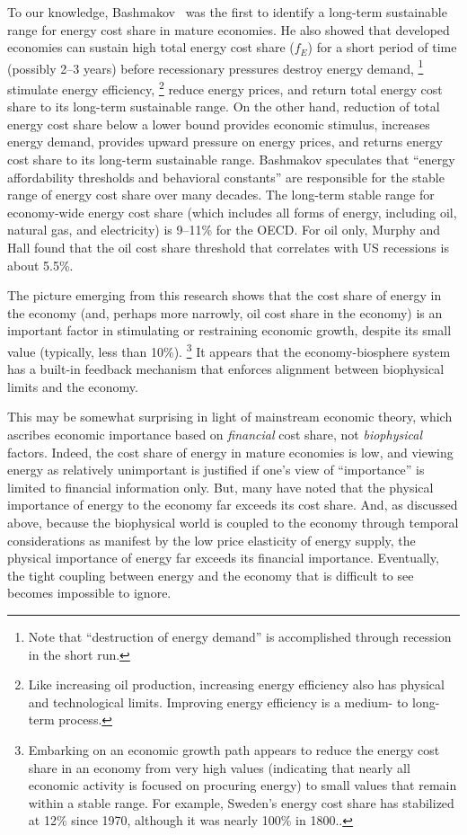 To our knowledge, 
Bashmakov~\cite{Bashmakov:2007ek} was the first to 
identify a long-term sustainable range for energy cost share
in mature economies.
He also showed that developed economies 
can sustain high total energy cost share ($f_E$) 
for a short period of time 
(possibly 2--3 years) 
before recessionary pressures 
destroy energy demand,%
	\footnote{
	Note that ``destruction of energy demand'' 
	is accomplished through recession
	in the short run.
	}
stimulate energy efficiency,%
	\footnote{
	Like increasing oil production, 
	increasing energy efficiency also has 
	physical and technological limits.
	Improving energy efficiency is a medium- to long-term process. 
	}
reduce energy prices, 
and return total energy cost share to its long-term sustainable range.
On the other hand, reduction of total energy cost share below 
a lower bound provides economic stimulus, 
increases energy demand, 
provides upward pressure on energy prices, 
and returns energy cost share to its long-term sustainable range.
Bashmakov speculates that 
``energy affordability thresholds and behavioral constants'' 
are responsible for the stable range of energy cost share 
over many decades.\cite[p.~3585]{Bashmakov:2007ek} 
The long-term stable range for economy-wide energy cost share 
(which includes all forms of energy, including oil, natural gas, and electricity)
is 9--11\% for the OECD. 
For oil only, Murphy and Hall found that 
the oil cost share threshold that correlates with US recessions 
is about 5.5\%.\cite{Murphy:2011jh}

The picture emerging from this research shows that 
the cost share of energy in the economy
(and, perhaps more narrowly, oil cost share in the economy)
is an important factor in stimulating or restraining economic growth,
despite its small value (typically, less than 10\%).%
	\footnote{
	Embarking on an economic growth path
	appears to reduce the energy cost share in an economy from very high values
	(indicating that nearly all economic activity is focused on procuring energy)
	to small values that remain within a stable range.
	For example, Sweden's energy cost share has stabilized at 12\% since 1970,
	although it was nearly 100\% in 1800.\cite{Stern:2012ey}.
	}
It appears that the economy-biosphere system has 
a built-in feedback mechanism that 
enforces alignment between biophysical limits and the economy.

This may be somewhat surprising in light of mainstream economic theory, 
which ascribes economic importance 
based on \emph{financial} cost share, 
not \emph{biophysical} factors. 
Indeed, the cost share of energy in mature economies is low, 
and viewing energy as relatively unimportant is justified if
one's view of ``importance'' is limited to financial information only.
But, many have noted that the physical importance of energy to the economy 
far exceeds its cost share.\cite{Ayres:2013aa}
And, as discussed above, because the biophysical world is coupled 
to the economy through temporal considerations as manifest 
by the low price elasticity of energy supply, 
the physical importance of energy far exceeds its financial importance.
Eventually, the tight coupling between energy and the economy 
that is difficult to see becomes impossible to ignore.


